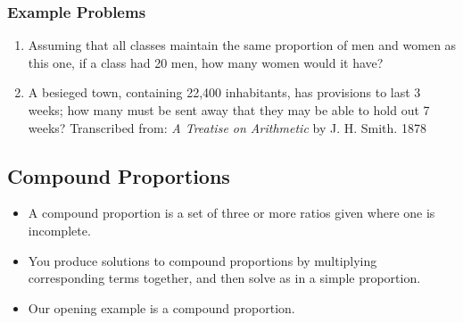 \documentclass{article}
\begin{document}
\subsubsection*{Example Problems}
\begin{enumerate}
\item Assuming that all classes maintain the same proportion of men and women as this one,
if a class had 20 men, how many women would it have?
\item A besieged town, containing 22,400 inhabitants, has provisions to
last 3 weeks; how many must be sent away that they may be able to hold out 7 weeks? \footnotesize{Transcribed from: {\em A Treatise on Arithmetic} by J. H. Smith. 1878}
\end{enumerate}

\subsection*{Compound Proportions}
\begin{itemize}
    \item A compound proportion is a set of three or more ratios given where one is incomplete.
    \item You produce solutions to compound proportions by multiplying corresponding terms together, and then solve 
    as in a simple proportion.
    \item Our opening example is a compound proportion.
\end{itemize}
\end{document}
